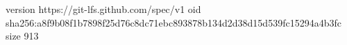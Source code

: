 version https://git-lfs.github.com/spec/v1
oid sha256:a8f9b08f1b7898f25d76c8dc71ebc893878b134d2d38d15d539fc15294a4b3fc
size 913

